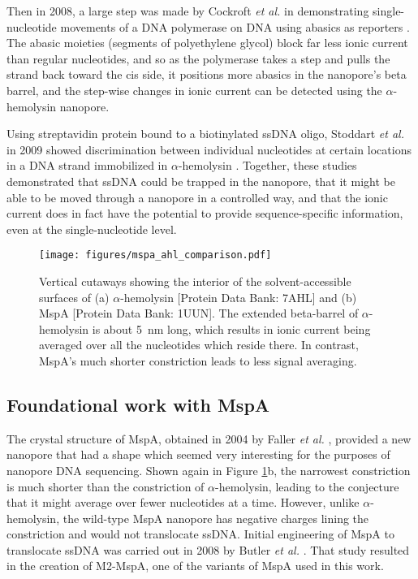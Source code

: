 Then in 2008, a large step was made by Cockroft \textit{et al.} in demonstrating single-nucleotide movements of a DNA polymerase on DNA using abasics as reporters \citep{Cockroft2008}.  The abasic moieties (segments of polyethylene glycol) block far less ionic current than regular nucleotides, and so as the polymerase takes a step and pulls the strand back toward the cis side, it positions more abasics in the nanopore's beta barrel, and the step-wise changes in ionic current can be detected using the $\alpha$-hemolysin nanopore.

Using streptavidin protein bound to a biotinylated ssDNA oligo, Stoddart \textit{et al.} in 2009 showed discrimination between individual nucleotides at certain locations in a DNA strand immobilized in $\alpha$-hemolysin \citep{Stoddart2009}.  Together, these studies demonstrated that ssDNA could be trapped in the nanopore, that it might be able to be moved through a nanopore in a controlled way, and that the ionic current does in fact have the potential to provide sequence-specific information, even at the single-nucleotide level.

\begin{figure}[h]
\begin{centering}
\texttt{[image: figures/mspa\_ahl\_comparison.pdf]}
\caption[Comparison between geometries of MspA and $\alpha$-hemolysin]{Vertical cutaways showing the interior of the solvent-accessible surfaces of (a) $\alpha$-hemolysin [Protein Data Bank: 7AHL] and (b) MspA [Protein Data Bank: 1UUN].  The extended beta-barrel of $\alpha$-hemolysin is about \SI{5}{nm} long, which results in ionic current being averaged over all the nucleotides which reside there.  In contrast, MspA's much shorter constriction leads to less signal averaging.}
\label{fig:mspa_ahl}
\end{centering}
\end{figure}

\subsection{Foundational work with MspA}

The crystal structure of MspA, obtained in 2004 by Faller \textit{et al.} \citep{Faller2004}, provided a new nanopore that had a shape which seemed very interesting for the purposes of nanopore DNA sequencing.  Shown again in Figure \ref{fig:mspa_ahl}b, the narrowest constriction is much shorter than the constriction of $\alpha$-hemolysin, leading to the conjecture that it might average over fewer nucleotides at a time.  However, unlike $\alpha$-hemolysin, the wild-type MspA nanopore has negative charges lining the constriction and would not translocate ssDNA.  Initial engineering of MspA to translocate ssDNA was carried out in 2008 by Butler \textit{et al.} \citep{Butler2008}.  That study resulted in the creation of M2-MspA, one of the variants of MspA used in this work.

